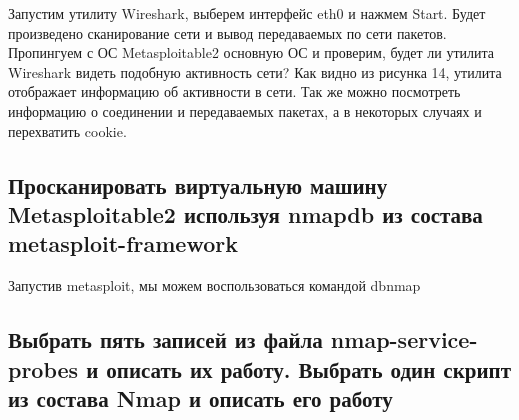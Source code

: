 \documentclass[11pt, a4paper]{article}		%
\begin{document}
Запустим утилиту Wireshark, выберем интерфейс eth0 и нажмем Start. Будет произведено сканирование сети и вывод передаваемых по сети пакетов. Пропингуем с ОС Metasploitable2 основную ОС и проверим, будет ли утилита Wireshark видеть подобную активность сети? Как видно из рисунка 14, утилита отображает информацию об активности в сети. Так же можно посмотреть информацию о соединении и передаваемых пакетах, а в некоторых случаях и перехватить cookie.


\subsection{Просканировать виртуальную машину Metasploitable2 используя nmapdb из состава metasploit-framework}

Запустив metasploit, мы можем воспользоваться командой dbnmap



\subsection{Выбрать пять записей из файла nmap-service-probes и описать их работу. Выбрать один скрипт из состава Nmap и описать его работу}
\end{document}
